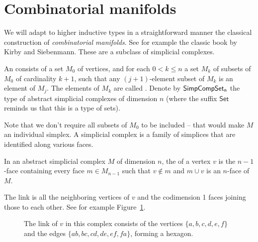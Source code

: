 \section{Combinatorial manifolds}

We will adapt to higher inductive types in a straightforward manner the classical construction of \emph{combinatorial manifolds}. See for example the classic book by Kirby and Siebenmann\cite{kirby_siebenmann}. These are a subclass of simplicial complexes.

\begin{mydef}
An  consists of a set \( M_0 \) of vertices, and for each \( 0<k\leq n \) a set \( M_k \) of subsets of \( M_0 \) of cardinality \( k+1 \), such that any \( (j+1) \)-element subset of \( M_k \) is an element of \( M_j \). The elements of \( M_k \) are called . Denote by \( \mathsf{SimpCompSet_n} \) the type of abstract simplicial complexes of dimension \( n \) (where the suffix \( \mathsf{Set} \) reminds us that this is a type of sets).
\end{mydef}

Note that we don't require all subsets of \( M_0 \) to be included -- that would make \( M \) an individual simplex. A simplicial complex is a family of simplices that are identified along various faces.

\begin{mydef}
In an abstract simplicial complex \( M \) of dimension \( n \), the  of a vertex \( v \) is the \( n-1 \)-face containing every face \( m\in M_{n-1} \) such that \( v\notin m \) and \( m\cup v \) is an \( n \)-face of \( M \).
\end{mydef}

The link is all the neighboring vertices of \( v \) and the codimension 1 faces joining those to each other. See for example Figure~\ref{fig:link}.

\begin{figure}[htbp]
\centering
{}
\caption{The link of \( v \) in this complex consists of the vertices \( \{a,b,c,d,e,f\} \) and the edges \( \{ab,bc,cd,de,ef,fa\} \), forming a hexagon.}
\label{fig:link}
\end{figure}

